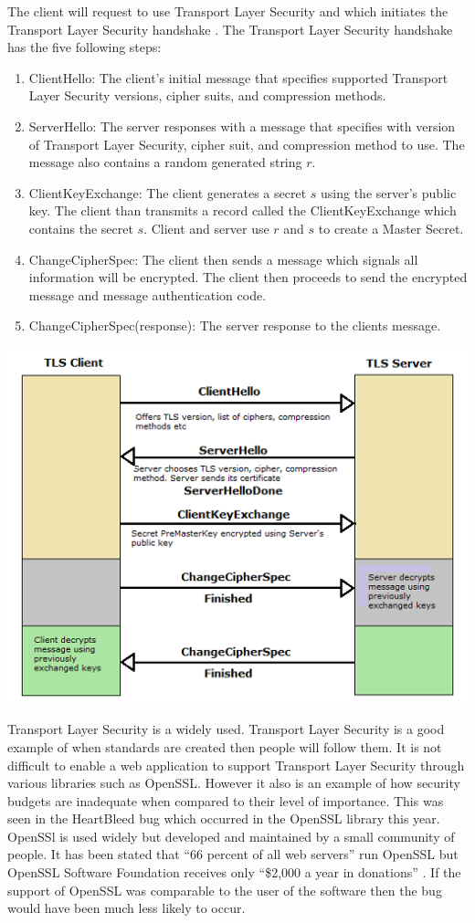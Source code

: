 \documentclass[12pt]{article}
\begin{document}
The client will request to use Transport Layer Security and which initiates the Transport Layer Security handshake \cite{Sidhpurwala}.  The Transport Layer Security handshake has the five following steps:
\begin{enumerate}
	\item ClientHello: The client's initial message that specifies supported Transport Layer Security versions, cipher suits, and compression methods. 
	\item ServerHello: The server responses with a message that specifies with version of Transport Layer Security, cipher suit, and compression method to use. The message also contains a random generated string $r$.
	\item ClientKeyExchange: The client generates a secret $s$ using the server's public key. The client than transmits a record called the ClientKeyExchange which contains the secret $s$. Client and server use $r$ and $s$ to create a Master Secret. 
	\item ChangeCipherSpec: The client then sends a message which signals all information will be encrypted. The client then proceeds to send the encrypted message and message authentication code. 
	\item ChangeCipherSpec(response): The server response to the clients message.
\end{enumerate}

\includegraphics{tls-handshake}
 
 Transport Layer Security is a widely used. Transport Layer Security is a good example of when standards are created then people will follow them. It is not difficult to enable a web application to support Transport Layer Security through various libraries such as OpenSSL. However it also is an example of how security budgets are inadequate when compared to their level of importance. This was seen in the HeartBleed bug which occurred in the OpenSSL library this year. OpenSSl is used widely but developed and maintained by a small community of people. It has been stated that ``66 percent of all web servers'' run OpenSSL but OpenSSL Software Foundation receives only ``\$2,000 a year in donations'' \cite{Warren}. If the support of OpenSSL was comparable to the user of the software then the bug would have been much less likely to occur.
\end{document}
